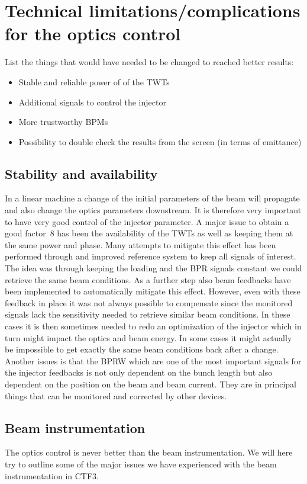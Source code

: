 \section{Technical limitations/complications for the optics control}

List the things that would have needed to be changed to reached better results:

\begin{itemize}
\item Stable and reliable power of of the TWTs
\item Additional signals to control the injector
\item More trustworthy BPMs
\item Possibility to double check the results from the screen (in terms of emittance)
\end{itemize}

\subsection{Stability and availability}
In a linear machine a change of the initial parameters of the beam will propagate and also change the optics parameters downstream. It is therefore very important to have very good control of the injector parameter. A major issue to obtain a good factor~8 has been the availability of the TWTs as well as keeping them at the same power and phase. Many attempts to mitigate this effect has been performed through and improved reference system to keep all signals of interest. The idea was through keeping the loading and the BPR signals constant we could retrieve the same beam conditions. As a further step also beam feedbacks have been implemented to automatically mitigate this effect. However, even with these feedback in place it was not always possible to compensate since the monitored signals lack the sensitivity needed to retrieve similar beam conditions. In these cases it is then sometimes needed to redo an optimization of the injector which in turn might impact the optics and beam energy.
In some cases it might actually be impossible to get exactly the same beam conditions back after a change. Another issues is that the BPRW which are one of the most important signals for the injector feedbacks is not only dependent on the bunch length but also dependent on the position on the beam and beam current. They are in principal things that can be monitored and corrected by other devices. 

\subsection{Beam instrumentation}
The optics control is never better than the beam instrumentation. We will here try to outline some of the major issues we have experienced with the beam instrumentation in CTF3.
